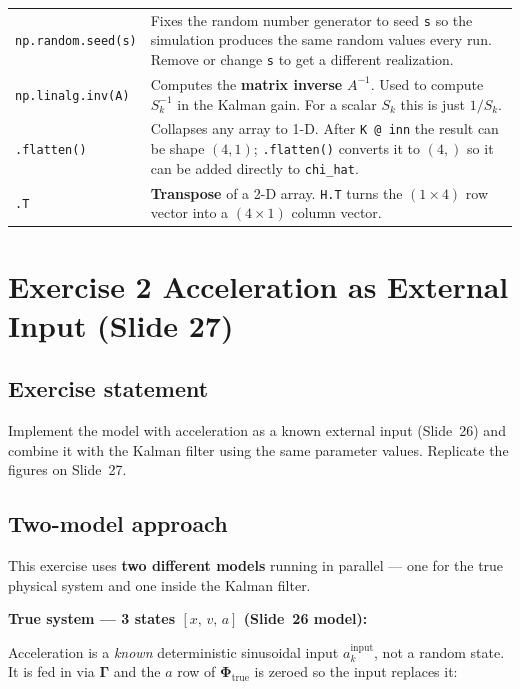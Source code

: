 \documentclass[12pt, a4paper]{article}
\begin{document}
\begin{center}
\begin{tabular}{p{4.5cm} p{9.0cm}}
  \texttt{np.random.seed(s)}
    & Fixes the random number generator to seed \texttt{s} so
      the simulation produces the same random values every run.
      Remove or change \texttt{s} to get a different realization. \\
  \texttt{np.linalg.inv(A)}
    & Computes the \textbf{matrix inverse} $A^{-1}$.
      Used to compute $S_k^{-1}$ in the Kalman gain.
      For a scalar $S_k$ this is just $1/S_k$. \\
  \texttt{.flatten()}
    & Collapses any array to 1-D.
      After \texttt{K @ inn} the result can be shape $(4,1)$;
      \texttt{.flatten()} converts it to $(4,)$ so it can be
      added directly to \texttt{chi\_hat}. \\
  \texttt{.T}
    & \textbf{Transpose} of a 2-D array.
      \texttt{H.T} turns the $(1\times4)$ row vector into a
      $(4\times1)$ column vector. \\
  \bottomrule
\end{tabular}
\end{center}

\clearpage
\section*{Exercise 2 \quad Acceleration as External Input (Slide 27)}

\subsection*{Exercise statement}

Implement the model with acceleration as a known external input (Slide~26)
and combine it with the Kalman filter using the same parameter values.
Replicate the figures on Slide~27.

\subsection*{Two-model approach}

This exercise uses \textbf{two different models} running in parallel ---
one for the true physical system and one inside the Kalman filter.

\medskip
\textbf{True system --- 3 states $[x,\,v,\,a]$ (Slide~26 model):}

Acceleration is a \emph{known} deterministic sinusoidal input
$a_k^{\text{input}}$, not a random state.
It is fed in via $\boldsymbol{\Gamma}$ and the $a$ row of
$\boldsymbol{\Phi}_{\text{true}}$ is zeroed so the input replaces it:
\end{document}
